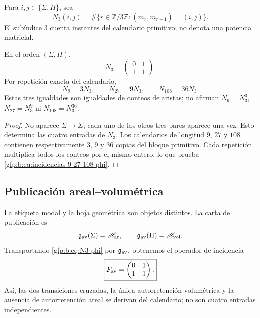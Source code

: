 \begin{definition}
Para \(i,j\in\{\Sigma,\Pi\}\), sea
\[
 N_3(i,j)=
 \#\{r\in\mathbb Z/3\mathbb Z:(m_r,m_{r+1})=(i,j)\}.
\]
El subíndice \(3\) cuenta instantes del calendario primitivo; no denota una
potencia matricial.
\end{definition}

\begin{theorem}
\label{gfp:b:thm:descenso-incidencia-modal-phi}
En el orden \((\Sigma,\Pi)\),
\begin{equation}
 \boxed{
 N_3=
 \begin{pmatrix}
 0&1\\
 1&1
 \end{pmatrix}.}
 \label{gfp:b:eq:N3-phi}
\end{equation}
Por repetición exacta del calendario,
\begin{equation}
 \boxed{
 N_9=3N_3,
 \qquad
 N_{27}=9N_3,
 \qquad
 N_{108}=36N_3.}
 \label{gfp:b:eq:incidencias-9-27-108-phi}
\end{equation}
Estas tres igualdades son igualdades de conteos de aristas; no afirman
\(N_9=N_3^3\), \(N_{27}=N_3^9\) ni \(N_{108}=N_3^{36}\).
\end{theorem}

\begin{proof}
No aparece \(\Sigma\to\Sigma\); cada uno de los otros tres pares aparece
una vez. Esto determina las cuatro entradas de \(N_3\). Los calendarios de
longitud \(9\), \(27\) y \(108\) contienen respectivamente \(3\), \(9\)
y \(36\) copias del bloque primitivo. Cada repetición multiplica todos los
conteos por el mismo entero, lo que prueba
\eqref{gfp:b:eq:incidencias-9-27-108-phi}.
\end{proof}

\subsection{Publicación areal--volumétrica}

La etiqueta modal y la hoja geométrica son objetos distintos. La carta
de publicación es
\[
 \mathfrak g_{\rm av}(\Sigma)=\mathscr H_{\rm ar},
 \qquad
 \mathfrak g_{\rm av}(\Pi)=\mathscr H_{\rm vol}.
\]
Transportando \eqref{gfp:b:eq:N3-phi} por \(\mathfrak g_{\rm av}\), obtenemos
el operador de incidencia
\begin{equation}
 \boxed{
 F_{\rm av}=
 \begin{pmatrix}
 0&1\\
 1&1
 \end{pmatrix}.}
 \label{gfp:b:eq:Fav-derivada-phi}
\end{equation}
Así, las dos transiciones cruzadas, la única autorretención volumétrica y la
ausencia de autorretención areal se derivan del calendario; no son cuatro
entradas independientes.


